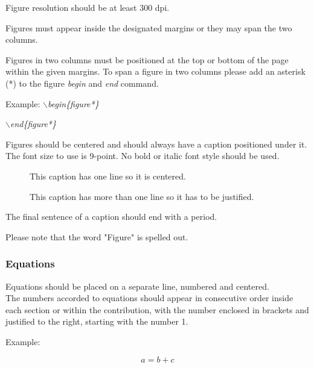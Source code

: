 \documentclass[a4paper,twoside]{article}
\begin{document}
Figure resolution should be at least 300 dpi.

Figures must appear inside the designated margins or they may span the two columns.

Figures in two columns must be positioned at the top or bottom of the page within the given margins. To span a figure in two columns please add an asterisk (*) to the figure \textit{begin} and \textit{end} command.

Example: \textit{$\backslash$begin\{figure*\}}

\hspace*{1.5cm}\textit{$\backslash$end\{figure*\}}

Figures should be centered and should always have a caption positioned under it. The font size to use is 9-point. No bold or italic font style should be used.

\begin{figure}[!h]
  \centering
   {}
  \caption{This caption has one line so it is centered.}
  \label{fig:example1}
 \end{figure}

\begin{figure}[!h]
  \vspace{-0.2cm}
  \centering
   {}
  \caption{This caption has more than one line so it has to be justified.}
  \label{fig:example2}
\end{figure}

The final sentence of a caption should end with a period.



Please note that the word "Figure" is spelled out.

\subsubsection{Equations}

Equations should be placed on a separate line, numbered and centered.\\The numbers accorded to equations should appear in consecutive order inside each section or within the contribution, with the number enclosed in brackets and justified to the right, starting with the number 1.

Example:

\begin{equation}\label{eq1}
    a=b+c
\end{equation}
\end{document}
